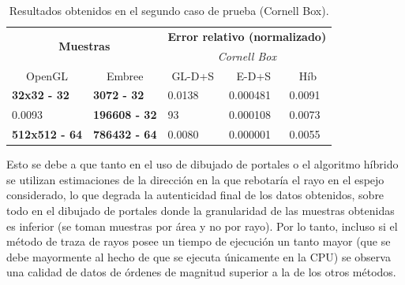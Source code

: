 \begin{table}[htbp!]
	\centering
	\begin{tabular}{|l|l|l|l|l|}
		\hline
		\multicolumn{2}{|c|}{\multirow{2}{*}{\textbf{Muestras}}} & \multicolumn{3}{c|}{\textbf{Error relativo (normalizado)}}\\ \cline{3-5} 
		\multicolumn{2}{|c|}{}                   & \multicolumn{3}{c|}{\textit{Cornell Box}}                                \\ \cline{1-5}
		\multicolumn{1}{|c|}{OpenGL} &\multicolumn{1}{c|}{Embree} & \multicolumn{1}{c|}{GL-D+S} & \multicolumn{1}{c|}{E-D+S} & \multicolumn{1}{c|}{Híb} \\ \hline
		\textbf{32x32 - 32}                                &
		\textbf{3072 - 32}                                & 0.0138                         & 0.000481                          & 0.0091                                \\ \hline
		0.0093                               &
		\textbf{196608 - 32}                               & 93                         & 0.000108                         & 0.0073                             \\ \hline
		\textbf{512x512 - 64} &\textbf{786432 - 64}                              & 0.0080                        & 0.000001                         & 0.0055                             \\ \hline
	\end{tabular}
	\caption{Resultados obtenidos en el segundo caso de prueba (Cornell Box).}
	\label{tab:caso2err}
\end{table}

Esto se debe a que tanto en el uso de dibujado de portales o el algoritmo híbrido se utilizan estimaciones de la dirección en la que rebotaría el rayo en el espejo considerado, lo que degrada la autenticidad final de los datos obtenidos, sobre todo en el dibujado de portales donde la granularidad de las muestras obtenidas es inferior (se toman muestras por área y no por rayo). Por lo tanto, incluso si el método de traza de rayos posee un tiempo de ejecución un tanto mayor (que se debe mayormente al hecho de que se ejecuta únicamente en la CPU) se observa una calidad de datos de órdenes de magnitud superior a la de los otros métodos.

